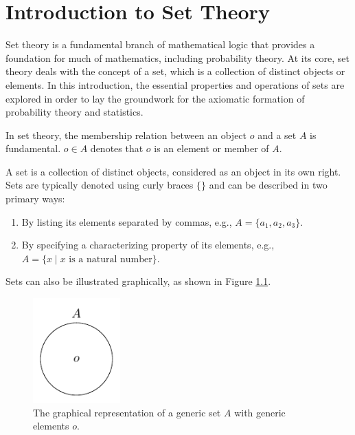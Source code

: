 \chapter{Introduction to Set Theory}
\label{chp:set_theory}
Set theory is a fundamental branch of mathematical logic that provides a foundation for much of mathematics, including probability theory. At its core, set theory deals with the concept of a set, which is a collection of distinct objects or elements. In this introduction, the essential properties and operations of sets are explored in order to lay the groundwork for the axiomatic formation of probability theory and statistics.


\begin{definition}[Membership]
	In set theory, the membership relation between an object $o$ and a set $A$ is fundamental. $o \in A$ denotes that $o$ is an element or member of $A$.
\end{definition}

\begin{definition}[Set]
	A set is a collection of distinct objects, considered as an object in its own right. Sets are typically denoted using curly braces $\{\}$ and can be described in two primary ways:
	\begin{enumerate}
		\item By listing its elements separated by commas, e.g., $A = \{a_1, a_2, a_3\}$.
		\item By specifying a characterizing property of its elements, e.g., $A = \{x \mid x \text{ is a natural number}\}$.
	\end{enumerate}
	Sets can also be illustrated graphically, as shown in Figure \ref{fig:generic_set}.
	\begin{figure}[H]
		\centering
		\includegraphics[width = 0.3\textwidth]{figures/generic_set.pdf}
		\caption{The graphical representation of a generic set $A$ with generic elements $o$.}
		\label{fig:generic_set}
	\end{figure}
\end{definition}

